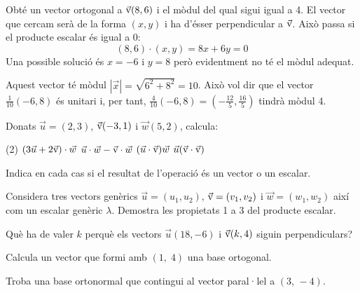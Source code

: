 \begin{resolt}[E]{Obté un vector ortogonal a $\vec{\mathrm{v}}(8,6)$ i el mòdul del qual sigui igual a 4.}
	El vector que cercam serà de la forma $(x,y)$ i ha d'ésser perpendicular a $\vec{\mathrm{v}}$. Això passa si el producte escalar és igual a 0:
	\begin{equation*}
	(8,6)\cdot(x,y)=8x+6y=0
	\end{equation*}
	Una possible solució és $x=-6$ i $y=8$ però evidentment no té el mòdul adequat. 
	
	Aquest vector té mòdul  $|\vec x|=\sqrt{6^2+8^2}=10$. Això vol dir que el vector $\frac{1}{10}(-6,8)$ és unitari i, per tant,  $\frac{4}{10}(-6,8)=(-\frac{12}{5}, \frac{16}{5})$ tindrà mòdul 4.
\end{resolt}

\begin{mylist}


	\exer Donats $\vec u =(2,3)$, $\vec{\mathrm{v}} (-3,1)$ i $\vec w(5,2)$, calcula:
	\begin{tasks}(2)
		\task $(3\vec u + 2 \vec{\mathrm{v}}) \cdot \vec w$
		\task $\vec u \cdot \vec w - \vec{\mathrm{v}} \cdot \vec w$
		\task $(\vec u \cdot \vec{\mathrm{v}})\vec w$
		\task $\vec u (\vec{\mathrm{v}}\cdot \vec{\mathrm{v}})$
	\end{tasks}
	Indica en cada cas si el resultat de l'operació és un vector o un escalar.
	
	\answers{[22 un escalar, $=(\vec u -\vec v)\cdot \vec w=29$ un escalar, $(-15,-6)$ un vector, $(20,30)$ un vector]}
	
	\exer  Considera tres vectors genèrics $\vec{u}=\left(u_{1} ,u_{2} \right)$, $\vec{\mathrm{v}}=\left(v_{1} ,v_{2} \right)$ i $\vec{w}=\left(w_{1} ,w_{2} \right)$ així com un escalar genèric $\lambda$. Demostra les propietats 1 a 3 del producte escalar.
	
	\exer Què ha de valer $k$ perquè els vectors $\vec u(18, -6)$ i $\vec{\mathrm{v}}(k, 4)$ siguin perpendiculars?
	
	
	\exer  Calcula un vector que formi amb $\left(1,\; 4\right)$ una base ortogonal.
	
	
	\exer[1]  Troba una base ortonormal que contingui al vector paral·lel a $\left(3,\, -4\right)$.
	
\end{mylist}

\pagebreak
